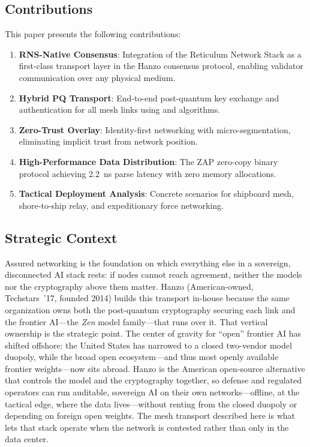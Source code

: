 \documentclass[11pt,letterpaper]{article}
\begin{document}
\subsection{Contributions}

This paper presents the following contributions:

\begin{enumerate}
\item \textbf{RNS-Native Consensus}: Integration of the Reticulum Network Stack as a first-class transport layer in the Hanzo consensus protocol, enabling validator communication over any physical medium.
\item \textbf{Hybrid PQ Transport}: End-to-end post-quantum key exchange and authentication for all mesh links using \nist{}  and  algorithms.
\item \textbf{Zero-Trust Overlay}: Identity-first networking with micro-segmentation, eliminating implicit trust from network position.
\item \textbf{High-Performance Data Distribution}: The ZAP zero-copy binary protocol achieving 2.2~ns parse latency with zero memory allocations.
\item \textbf{Tactical Deployment Analysis}: Concrete scenarios for shipboard mesh, shore-to-ship relay, and expeditionary force networking.
\end{enumerate}

\subsection{Strategic Context}

Assured networking is the foundation on which everything else in a sovereign, disconnected AI stack rests: if nodes cannot reach agreement, neither the models nor the cryptography above them matter. Hanzo (American-owned, Techstars~'17, founded 2014) builds this transport in-house because the same organization owns both the post-quantum cryptography securing each link and the frontier AI---the \emph{Zen} model family---that runs over it. That vertical ownership is the strategic point. The center of gravity for ``open'' frontier AI has shifted offshore: the United States has narrowed to a closed two-vendor model duopoly, while the broad open ecosystem---and thus most openly available frontier weights---now sits abroad. Hanzo is the American open-source alternative that controls the model and the cryptography together, so defense and regulated operators can run auditable, sovereign AI on their own networks---offline, at the tactical edge, where the data lives---without renting from the closed duopoly or depending on foreign open weights. The mesh transport described here is what lets that stack operate when the network is contested rather than only in the data center.
\end{document}
